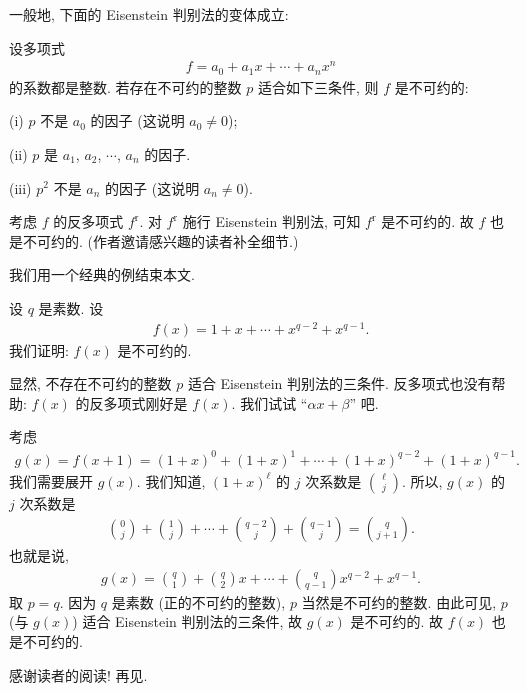 一般地, 下面的 Eisenstein 判别法的变体成立:

\begin{proposition}
    设多项式
    \begin{align*}
        f = a_0 + a_1 x + \cdots + a_n x^n
    \end{align*}
    的系数都是整数. 若存在不可约的整数 $p$ 适合如下三条件, 则 $f$ 是不可约的:

    (i) $p$ 不是 $a_0$ 的因子 (这说明 $a_0 \neq 0$);

    (ii) $p$ 是 $a_1$, $a_2$, $\cdots$, $a_n$ 的因子.

    (iii) $p^2$ 不是 $a_n$ 的因子 (这说明 $a_n \neq 0$).
\end{proposition}

\begin{pf}
    考虑 $f$ 的反多项式 $f^{\mathrm{r}}$. 对 $f^{\mathrm{r}}$ 施行 Eisenstein 判别法, 可知 $f^{\mathrm{r}}$ 是不可约的. 故 $f$ 也是不可约的. (作者邀请感兴趣的读者补全细节.)
\end{pf}

我们用一个经典的例结束本文.

\begin{example}
    设 $q$ 是素数. 设
    \begin{align*}
        f(x) = 1 + x + \cdots + x^{q-2} + x^{q-1}.
    \end{align*}
    我们证明: $f(x)$ 是不可约的.

    显然, 不存在不可约的整数 $p$ 适合 Eisenstein 判别法的三条件. 反多项式也没有帮助: $f(x)$ 的反多项式刚好是 $f(x)$. 我们试试 ``$\alpha x + \beta$'' 吧.

    考虑
    \begin{align*}
        g(x) = f(x + 1) = (1 + x)^0 + (1 + x)^1 + \cdots + (1 + x)^{q - 2} + (1 + x)^{q - 1}.
    \end{align*}
    我们需要展开 $g(x)$. 我们知道, $(1 + x)^\ell$ 的 $j$ 次系数是 $\binom{\ell}{j}$. 所以, $g(x)$ 的 $j$ 次系数是
    \begin{align*}
        \binom{0}{j} + \binom{1}{j} + \cdots + \binom{q-2}{j} + \binom{q-1}{j} = \binom{q}{j + 1}.
    \end{align*}
    也就是说,
    \begin{align*}
        g(x) = \binom{q}{1} + \binom{q}{2} x + \cdots + \binom{q}{q - 1} x^{q-2} + x^{q-1}.
    \end{align*}
    取 $p = q$. 因为 $q$ 是素数 (正的不可约的整数), $p$ 当然是不可约的整数. 由此可见, $p$ (与 $g(x)$) 适合 Eisenstein 判别法的三条件, 故 $g(x)$ 是不可约的. 故 $f(x)$ 也是不可约的.
\end{example}

感谢读者的阅读! 再见.
